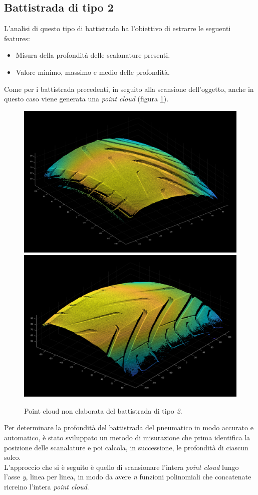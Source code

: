 \subsection{Battistrada di tipo 2}
L'analisi di questo tipo di battistrada ha l'obiettivo di estrarre le seguenti features:
\begin{itemize}
	\item Misura della profondità delle scalanature presenti.
	\item Valore minimo, massimo e medio delle profondità.
\end{itemize}

\noindent Come per i battistrada precedenti, in seguito alla scansione dell'oggetto, anche in questo caso viene generata una \textit{point cloud} (figura \ref{fig:batt_2_analisi_1}).\\

\begin{figure}[H]
	\centering
	\includegraphics[width=0.45\columnwidth]{./pictures/batt_2_analisi_1.png}
	\includegraphics[width=0.45\columnwidth]{./pictures/batt_2_analisi_2.png}
	\caption{Point cloud non elaborata del battistrada di tipo \textit{2}.}\label{fig:batt_2_analisi_1}
\end{figure}

\noindent Per determinare la profondità del battistrada del pneumatico in modo accurato e automatico, è stato sviluppato un metodo di misurazione che prima identifica la posizione delle scanalature e poi calcola, in successione, le profondità di ciascun solco.\\
\newline
L'approccio che si è seguito è quello di scansionare l'intera \textit{point cloud} lungo l'asse \textit{y}, linea per linea, in modo da avere \textit{n} funzioni polinomiali che concatenate ricreino l'intera \textit{point cloud}.\\

